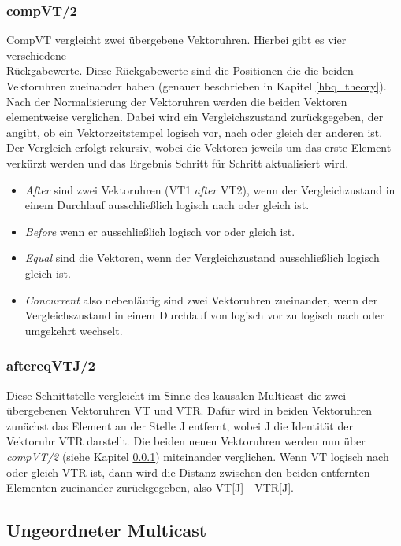 \subsubsection{compVT/2} \label{vectorC_comp}

CompVT vergleicht zwei übergebene Vektoruhren. Hierbei gibt es vier verschiedene\\ Rückgabewerte. Diese Rückgabewerte sind die Positionen die die beiden Vektoruhren zueinander haben (genauer beschrieben in Kapitel \ref{hbq_theory}).\\
Nach der Normalisierung der Vektoruhren werden die beiden Vektoren elementweise verglichen. Dabei wird ein Vergleichszustand zurückgegeben, der angibt, ob ein Vektorzeitstempel logisch vor, nach oder gleich der anderen ist. Der Vergleich erfolgt rekursiv, wobei die Vektoren jeweils um das erste Element verkürzt werden und das Ergebnis Schritt für Schritt aktualisiert wird.
\begin{itemize}
    \item \textit{After} sind zwei Vektoruhren (VT1 \textit{after} VT2), wenn der Vergleichzustand in einem Durchlauf ausschließlich logisch nach oder gleich ist.
    \item \textit{Before} wenn er ausschließlich logisch vor oder gleich ist.
    \item \textit{Equal} sind die Vektoren, wenn der Vergleichzustand ausschließlich logisch gleich ist.
    \item \textit{Concurrent} also nebenläufig sind zwei Vektoruhren zueinander, wenn der Vergleichszustand in einem Durchlauf von logisch vor zu logisch nach oder umgekehrt wechselt.
\end{itemize}

\subsubsection{aftereqVTJ/2} \label{aftereqvtj_entwurf}

Diese Schnittstelle vergleicht im Sinne des kausalen Multicast die zwei übergebenen Vektoruhren VT und VTR.
Dafür wird in beiden Vektoruhren zunächst das Element an der Stelle J entfernt, wobei J die Identität der Vektoruhr VTR darstellt.
Die beiden neuen Vektoruhren werden nun über \textit{compVT/2} (siehe Kapitel \ref{vectorC_comp}) miteinander verglichen. Wenn VT logisch nach oder gleich VTR ist, dann wird die Distanz zwischen den beiden entfernten Elementen zueinander zurückgegeben, also VT[J] - VTR[J].

\subsection{Ungeordneter Multicast}

